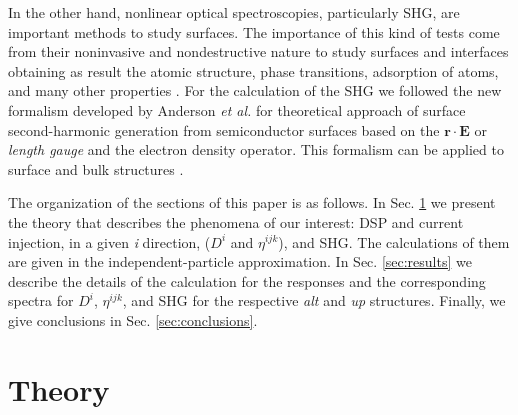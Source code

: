 \documentclass[aps,pra,11pt,tightenlines,showpacs,superscriptaddress,groupedaddress]{revtex4-1}
\begin{document}
In the other hand, nonlinear optical spectroscopies, particularly SHG, are
important methods to study surfaces. The importance of this kind of tests come
from their noninvasive and nondestructive nature to study surfaces and
interfaces obtaining as result the atomic structure, phase transitions,
adsorption of atoms, and many other properties \cite{dadap1997second,
daum1993identification,mcgilp1994probing,power1995resonant,
godefroy1996electric,salazar2014molecular,chen1981surface,
mendoza1998microscopic}. For the calculation of the SHG we followed the new
formalism developed by Anderson \emph{et al.} for theoretical approach of
surface second-harmonic generation from semiconductor surfaces
\cite{anderson2015theory} based on the $\mathbf{r}\cdot\mathbf{E} $ or
\textit{length gauge} and the electron density operator. This formalism can be
applied to surface and bulk structures \cite{anderson2015theory,sipe2000second}.

The organization of the sections of this paper is as follows. In Sec. \ref{sec:theory}
we present the theory that describes the phenomena of our interest: DSP and current injection, in a given
\emph{i} direction, ($D^{i}$ and $\eta^{ijk}$), and SHG. The calculations of them
are given in the independent-particle approximation. In Sec.
\ref{sec:results} we describe the details of the calculation for the responses
and the corresponding spectra for  $D^{i}$, $\eta^{ijk}$, and SHG for the
respective \emph{alt} and \emph{up} structures. Finally, we give conclusions in
Sec. \ref{sec:conclusions}.





\section{Theory} 
\label{sec:theory}
\end{document}
